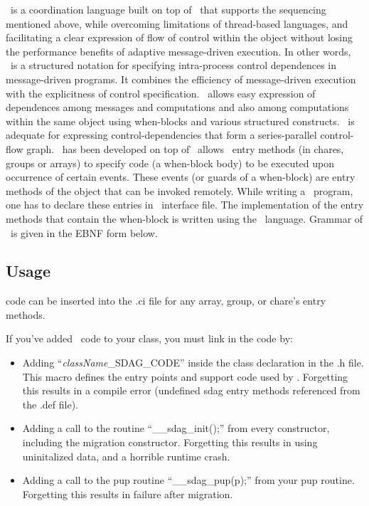 \sdag\ is a coordination language built on top of \charmpp\ that supports the
sequencing mentioned above, while overcoming limitations of thread-based
languages, and facilitating a clear expression of flow of control within the
object without losing the performance benefits of adaptive message-driven
execution.  In other words, \sdag\ is a structured notation for specifying
intra-process control dependences in message-driven programs. It combines the
efficiency of message-driven execution with the explicitness of control
specification. \sdag\ allows easy expression of dependences among messages and
computations and also among computations within the same object using
when-blocks and various structured constructs.  \sdag\ is adequate for
expressing control-dependencies that form a series-parallel control-flow graph.
\sdag\ has been developed on top of \charmpp\. \sdag\ allows \charmpp\ entry
methods (in chares, groups or arrays) to specify code (a when-block body) to be
executed upon occurrence of certain events.  These events (or guards of a
when-block) are entry methods of the object that can be invoked remotely. While
writing a \sdag\ program, one has to declare these entries in \charmpp\
interface file. The implementation of the entry methods that contain the
when-block is written using the \sdag\ language. Grammar of \sdag\ is given in
the EBNF form below.

\subsection{Usage}

\sdag{} code can be inserted into the .ci file for any array, group, or chare's entry methods.

If you've added \sdag\ code to your class, you must link in the code by:
\begin{itemize}
  \item Adding ``{\it className}\_SDAG\_CODE'' inside the class declaration
     in the .h file.  This macro defines the entry points and support
     code used by \sdag{}.  Forgetting this results in a compile error
     (undefined sdag entry methods referenced from the .def file).
  \item Adding a call to the routine ``\_\_sdag\_init();'' from every constructor,
     including the migration constructor.  Forgetting this results in
     using uninitalized data, and a horrible runtime crash.
  \item Adding a call to the pup routine ``\_\_sdag\_pup(p);'' from your pup routine.
     Forgetting this results in failure after migration.
\end{itemize}

